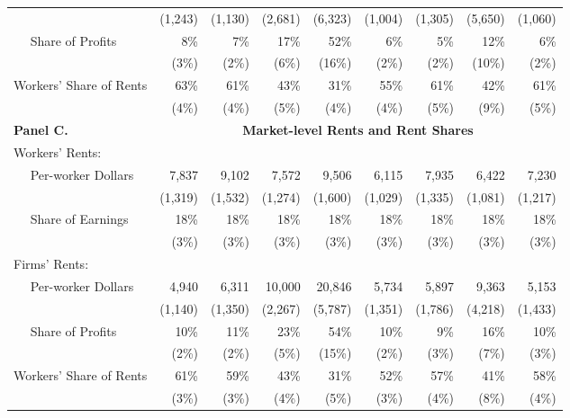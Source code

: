 \begin{tabular}{lrrrrrrrr}
  & {(\footnotesize 1,243)} & {(\footnotesize 1,130)} & {(\footnotesize 2,681)} & {(\footnotesize 6,323)} & {(\footnotesize 1,004)} & {(\footnotesize 1,305)} & {(\footnotesize 5,650)} & {(\footnotesize 1,060)} \\[5pt]
$\quad$ Share of Profits & 8\% & 7\% & 17\% & 52\% & 6\% & 5\% & 12\% & 6\% \\
  & {(\footnotesize 3\%)} & {(\footnotesize 2\%)} & {(\footnotesize 6\%)} & {(\footnotesize 16\%)} & {(\footnotesize 2\%)} & {(\footnotesize 2\%)} & {(\footnotesize 10\%)} & {(\footnotesize 2\%)} \\[5pt]
Workers' Share of Rents & 63\% & 61\% & 43\% & 31\% & 55\% & 61\% & 42\% & 61\% \\
  & {(\footnotesize 4\%)} & {(\footnotesize 4\%)} & {(\footnotesize 5\%)} & {(\footnotesize 4\%)} & {(\footnotesize 4\%)} & {(\footnotesize 5\%)} & {(\footnotesize 9\%)} & {(\footnotesize 5\%)} \\[5pt]
\midrule 
\textbf{Panel C.} & \multicolumn{8}{c}{\textbf{Market-level Rents and Rent Shares}} \\
 \cmidrule(lr){2-9} 
Workers' Rents: \\
$\quad$ Per-worker Dollars & 7,837 & 9,102 & 7,572 & 9,506 & 6,115 & 7,935 & 6,422 & 7,230 \\
  & {(\footnotesize 1,319)} & {(\footnotesize 1,532)} & {(\footnotesize 1,274)} & {(\footnotesize 1,600)} & {(\footnotesize 1,029)} & {(\footnotesize 1,335)} & {(\footnotesize 1,081)} & {(\footnotesize 1,217)} \\[5pt]
$\quad$ Share of Earnings & 18\% & 18\% & 18\% & 18\% & 18\% & 18\% & 18\% & 18\% \\
  & {(\footnotesize 3\%)} & {(\footnotesize 3\%)} & {(\footnotesize 3\%)} & {(\footnotesize 3\%)} & {(\footnotesize 3\%)} & {(\footnotesize 3\%)} & {(\footnotesize 3\%)} & {(\footnotesize 3\%)} \\[5pt]
Firms' Rents: \\
$\quad$ Per-worker Dollars & 4,940 & 6,311 & 10,000 & 20,846 & 5,734 & 5,897 & 9,363 & 5,153 \\
  & {(\footnotesize 1,140)} & {(\footnotesize 1,350)} & {(\footnotesize 2,267)} & {(\footnotesize 5,787)} & {(\footnotesize 1,351)} & {(\footnotesize 1,786)} & {(\footnotesize 4,218)} & {(\footnotesize 1,433)} \\[5pt]
$\quad$ Share of Profits & 10\% & 11\% & 23\% & 54\% & 10\% & 9\% & 16\% & 10\% \\
  & {(\footnotesize 2\%)} & {(\footnotesize 2\%)} & {(\footnotesize 5\%)} & {(\footnotesize 15\%)} & {(\footnotesize 2\%)} & {(\footnotesize 3\%)} & {(\footnotesize 7\%)} & {(\footnotesize 3\%)} \\[5pt]
Workers' Share of Rents & 61\% & 59\% & 43\% & 31\% & 52\% & 57\% & 41\% & 58\% \\
  & {(\footnotesize 3\%)} & {(\footnotesize 3\%)} & {(\footnotesize 4\%)} & {(\footnotesize 5\%)} & {(\footnotesize 3\%)} & {(\footnotesize 4\%)} & {(\footnotesize 8\%)} & {(\footnotesize 4\%)} \\
\midrule 
\bottomrule 
\end{tabular}
